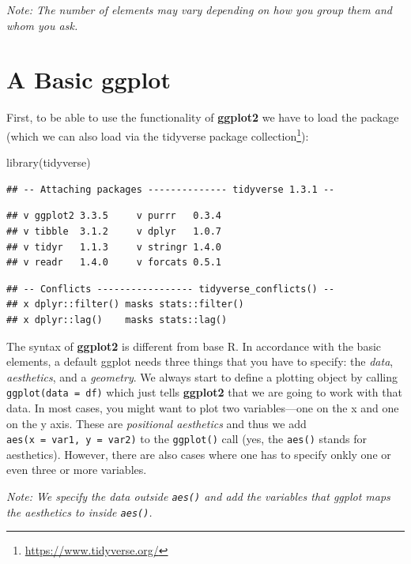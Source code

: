 \documentclass[
]{krantz}
\makeatletter
\newenvironment{Shaded}{\begin{snugshade}}{\end{snugshade}}
\newcommand{\FunctionTok}[1]{\textcolor[rgb]{0,0,0}{#1}}
\newcommand{\NormalTok}[1]{#1}
\renewcommand{\href}[2]{#2\footnote{\url{#1}}}
\newenvironment{kframe}{%
\medskip{}
\setlength{\fboxsep}{.8em}
 \def\at@end@of@kframe{}%
 \ifinner\ifhmode%
  \def\at@end@of@kframe{\end{minipage}}%
  \begin{minipage}{\columnwidth}%
 \fi\fi%
 \def\FrameCommand##1{\hskip\@totalleftmargin \hskip-\fboxsep
 \colorbox{shadecolor}{##1}\hskip-\fboxsep
     \hskip-\linewidth \hskip-\@totalleftmargin \hskip\columnwidth}%
 \MakeFramed {\advance\hsize-\width
   \@totalleftmargin\z@ \linewidth\hsize
   \@setminipage}}%
 {\par\unskip\endMakeFramed%
 \at@end@of@kframe}
\renewenvironment{Shaded}{\begin{kframe}}{\end{kframe}}
\makeatother
\begin{document}
\emph{Note: The number of elements may vary depending on how you group them and whom you ask.}

\hypertarget{default}{%
\section{A Basic ggplot}\label{default}}

First, to be able to use the functionality of \textbf{ggplot2} we have to load the package (which we can also load via the \href{https://www.tidyverse.org/}{tidyverse package collection}):

\begin{Shaded}
\begin{Highlighting}[]
\FunctionTok{library}\NormalTok{(tidyverse)}
\end{Highlighting}
\end{Shaded}

\begin{verbatim}
## -- Attaching packages -------------- tidyverse 1.3.1 --
\end{verbatim}

\begin{verbatim}
## v ggplot2 3.3.5     v purrr   0.3.4
## v tibble  3.1.2     v dplyr   1.0.7
## v tidyr   1.1.3     v stringr 1.4.0
## v readr   1.4.0     v forcats 0.5.1
\end{verbatim}

\begin{verbatim}
## -- Conflicts ----------------- tidyverse_conflicts() --
## x dplyr::filter() masks stats::filter()
## x dplyr::lag()    masks stats::lag()
\end{verbatim}

The syntax of \textbf{ggplot2} is different from base R. In accordance with the basic elements, a default ggplot needs three things that you have to specify: the \emph{data}, \emph{aesthetics}, and a \emph{geometry}. We always start to define a plotting object by calling \texttt{ggplot(data\ =\ df)} which just tells \textbf{ggplot2} that we are going to work with that data. In most cases, you might want to plot two variables---one on the x and one on the y axis. These are \emph{positional aesthetics} and thus we add \texttt{aes(x\ =\ var1,\ y\ =\ var2)} to the \texttt{ggplot()} call (yes, the \texttt{aes()} stands for aesthetics). However, there are also cases where one has to specify onkly one or even three or more variables.

\emph{Note: We specify the data outside \texttt{aes()} and add the variables that ggplot maps the aesthetics to inside \texttt{aes()}.}
\end{document}
